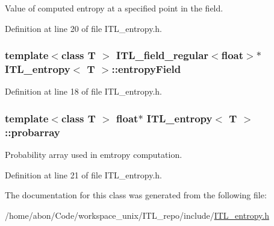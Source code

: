 Value of computed entropy at a specified point in the field. 



Definition at line 20 of file ITL\_\-entropy.h.

\hypertarget{classITL__entropy_ac9940978878a0f624d94ada66fc1bfd5}{
\subsubsection[{entropyField}]{\setlength{\rightskip}{0pt plus 5cm}template$<$class T $>$ {\bf ITL\_\-field\_\-regular}$<$float$>$$\ast$ {\bf ITL\_\-entropy}$<$ T $>$::{\bf entropyField}}}
\label{classITL__entropy_ac9940978878a0f624d94ada66fc1bfd5}


Definition at line 18 of file ITL\_\-entropy.h.

\hypertarget{classITL__entropy_abd080665e882ac3a2e56fd23ec104114}{
\subsubsection[{probarray}]{\setlength{\rightskip}{0pt plus 5cm}template$<$class T $>$ float$\ast$ {\bf ITL\_\-entropy}$<$ T $>$::{\bf probarray}}}
\label{classITL__entropy_abd080665e882ac3a2e56fd23ec104114}


Probability array used in emtropy computation. 



Definition at line 21 of file ITL\_\-entropy.h.



The documentation for this class was generated from the following file:\begin{DoxyCompactItemize}
\item 
/home/abon/Code/workspace\_\-unix/ITL\_\-repo/include/\hyperlink{ITL__entropy_8h}{ITL\_\-entropy.h}\end{DoxyCompactItemize}
